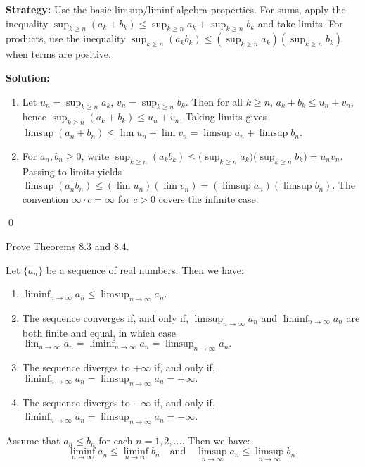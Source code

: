 \noindent\textbf{Strategy:} Use the basic limsup/liminf algebra properties. For sums, apply the inequality \(\sup_{k\ge n}(a_k+b_k)\le \sup_{k\ge n} a_k + \sup_{k\ge n} b_k\) and take limits. For products, use the inequality \(\sup_{k\ge n}(a_k b_k)\le (\sup_{k\ge n} a_k)(\sup_{k\ge n} b_k)\) when terms are positive.

\bigskip\noindent\textbf{Solution:}
\begin{enumerate}[label=(\alph*)]
\item Let \(u_n=\sup_{k\ge n} a_k\), \(v_n=\sup_{k\ge n} b_k\). Then for all \(k\ge n\), \(a_k+b_k\le u_n+v_n\), hence \(\sup_{k\ge n}(a_k+b_k)\le u_n+v_n\). Taking limits gives \(\limsup(a_n+b_n)\le \lim u_n+\lim v_n=\limsup a_n+\limsup b_n\).
\item For \(a_n,b_n\ge 0\), write \(\sup_{k\ge n}(a_k b_k)\le \big(\sup_{k\ge n} a_k\big)\big(\sup_{k\ge n} b_k\big)=u_n v_n\). Passing to limits yields \(\limsup(a_n b_n)\le (\lim u_n)(\lim v_n)=(\limsup a_n)(\limsup b_n)\). The convention \(\infty\cdot c=\infty\) for \(c>0\) covers the infinite case.
\end{enumerate}\qed


\begin{problembox}

Prove Theorems 8.3 and 8.4.

\begin{theorem}[Theorem 8.3]
Let \(\{a_n\}\) be a sequence of real numbers. Then we have:
\begin{enumerate}[label=\alph*)]
\item \(\liminf_{n \to \infty} a_n \leq \limsup_{n \to \infty} a_n.\)
\item The sequence converges if, and only if, \(\limsup_{n \to \infty} a_n\) and \(\liminf_{n \to \infty} a_n\) are both finite and equal, in which case \(\lim_{n \to \infty} a_n = \liminf_{n \to \infty} a_n = \limsup_{n \to \infty} a_n.\)
\item The sequence diverges to \(+\infty\) if, and only if, \(\liminf_{n \to \infty} a_n = \limsup_{n \to \infty} a_n = +\infty.\)
\item The sequence diverges to \(-\infty\) if, and only if, \(\liminf_{n \to \infty} a_n = \limsup_{n \to \infty} a_n = -\infty\).
\end{enumerate}
\end{theorem}

\begin{theorem}[Theorem 8.4]
Assume that \(a_n \leq b_n\) for each \(n = 1, 2, \ldots\). Then we have:
\[
\liminf_{n \to \infty} a_n \leq \liminf_{n \to \infty} b_n \quad \text{and} \quad \limsup_{n \to \infty} a_n \leq \limsup_{n \to \infty} b_n.
\]
\end{theorem}

\end{problembox}

